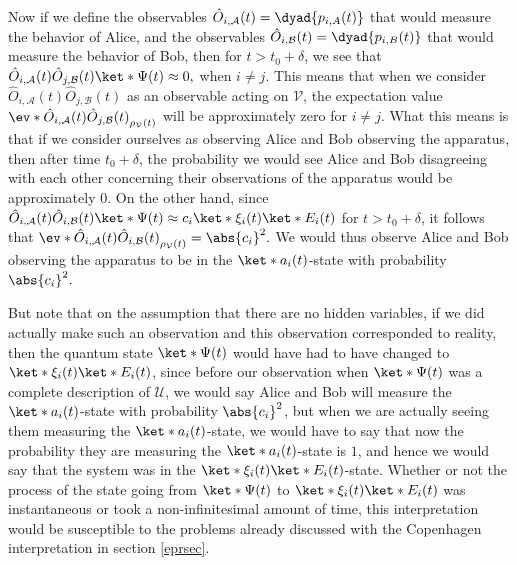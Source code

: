 \documentclass[12pt]{report}
\begin{document}
    Now if we define the observables $\hat{O}_{i,\mathcal{A}}(t)=\dyad{p_{i,A}(t)}$ that %
%
    would measure the behavior of Alice, and the observables $\hat{O}_{i,\mathcal{B}}(t)=\dyad{p_{i,B}(t)}$ that would measure the behavior of Bob, then for $t>t_0+\delta$, we see that $\hat{O}_{i,\mathcal{A}}(t)\hat{O}_{j,\mathcal{B}}(t)\ket*{\Psi(t)}\approx 0,$ when $i\neq j$. This means that when we consider $\hat{O}_{i,\mathcal{A}}(t)\hat{O}_{j,\mathcal{B}}(t)$ as an observable acting on $\mathcal{V}$,  the expectation value $\ev*{\hat{O}_{i,\mathcal{A}}(t)\hat{O}_{j,\mathcal{B}}(t)}_{\rho_\mathcal{V}(t)}$ will be approximately zero for $i\neq j$. What this means is that if we consider ourselves as observing Alice and Bob observing the apparatus, then after time $t_0+\delta$, the probability we would see Alice and Bob disagreeing with each other concerning their observations of the apparatus would be approximately 0. 
     On the other hand, since $\hat{O}_{i,\mathcal{A}}(t)\hat{O}_{i,\mathcal{B}}(t)\ket*{\Psi(t)} \approx c_i \ket*{\xi_i(t)}\ket*{E_i(t)}$ for $t>t_0+\delta$, it follows that $\ev*{\hat{O}_{i,\mathcal{A}}(t)\hat{O}_{i,\mathcal{B}}(t)}_{\rho_\mathcal{V}(t)}=\abs{c_i}^2.$ 
     We would thus observe Alice and Bob observing the apparatus to be in the $\ket*{a_i(t)}$-state with probability $\abs{c_i}^2.$ 
     
     But note that on the assumption that there are no hidden variables, if we did actually make such an observation and this observation corresponded to reality, then the quantum state $\ket*{\Psi(t)}$ would have had to have changed to $\ket*{\xi_i(t)}\ket*{E_i(t)}$, since before our observation when $\ket*{\Psi(t)}$ was a complete description of $\mathcal{U}$, we would say Alice and Bob will measure the $\ket*{a_i(t)}$-state with probability $\abs{c_i}^2$, but when we are actually seeing them measuring the $\ket*{a_i(t)}$-state, we would have to say that now the probability they are measuring the $\ket*{a_i(t)}$-state is $1$, and hence we would say that the system was in the $\ket*{\xi_i(t)}\ket*{E_i(t)}$-state. Whether or not the process of the state going from $\ket*{\Psi(t)}$ to $\ket*{\xi_i(t)}\ket*{E_i(t)}$ was instantaneous or took a non-infinitesimal amount of time, this interpretation would be susceptible to the problems already discussed with the Copenhagen interpretation in section \ref{eprsec}.
    
\end{document}
